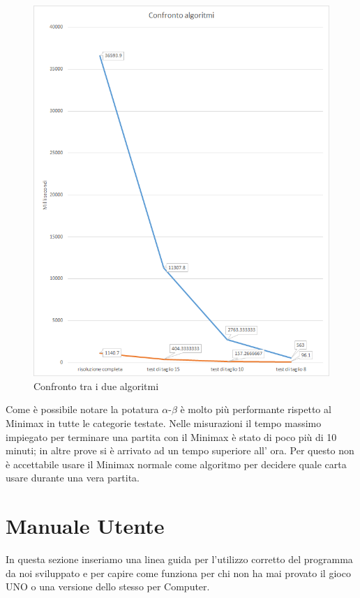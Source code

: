 	\begin{figure}[h!]
		\centering
		\includegraphics[scale=0.8]{grafico3.png}
		\caption{Confronto tra i due algoritmi}
		\label{fig6}
	\end{figure}

	\newpage
	Come è possibile notare la potatura $\alpha$-$\beta$ è molto più performante rispetto al Minimax in tutte le categorie testate. Nelle misurazioni il tempo massimo impiegato per terminare una partita con il Minimax è stato di poco più di 10 minuti; in altre prove si è arrivato ad un tempo superiore all' ora. Per questo non è accettabile usare il Minimax normale come algoritmo per decidere quale carta usare durante una vera partita.
	
\section{Manuale Utente}
	In questa sezione inseriamo una linea guida per l'utilizzo corretto del programma da noi sviluppato e per capire come funziona per chi non ha mai provato il gioco UNO o una versione dello stesso per Computer.
	
